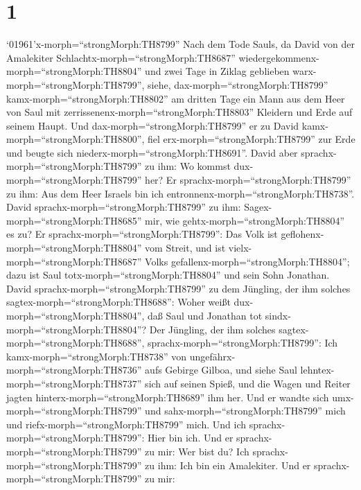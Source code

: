 \hypertarget{section}{%
\section{1}\label{section}}

 `01961'\textbar x-morph=``strongMorph:TH8799'' Nach dem
Tode Sauls, da David von der Amalekiter
Schlachtx-morph=``strongMorph:TH8687''
wiedergekommenx-morph=``strongMorph:TH8804'' und zwei Tage in Ziklag
geblieben warx-morph=``strongMorph:TH8799'',  siehe,
dax-morph=``strongMorph:TH8799'' kamx-morph=``strongMorph:TH8802'' am
dritten Tage ein Mann aus dem Heer von Saul mit
zerrissenenx-morph=``strongMorph:TH8803'' Kleidern und Erde auf seinem
Haupt. Und dax-morph=``strongMorph:TH8799'' er zu David
kamx-morph=``strongMorph:TH8800'', fiel erx-morph=``strongMorph:TH8799''
zur Erde und beugte sich niederx-morph=``strongMorph:TH8691''.
 David aber sprachx-morph=``strongMorph:TH8799'' zu ihm: Wo
kommst dux-morph=``strongMorph:TH8799'' her? Er
sprachx-morph=``strongMorph:TH8799'' zu ihm: Aus dem Heer Israels bin
ich entronnenx-morph=``strongMorph:TH8738''.  David
sprachx-morph=``strongMorph:TH8799'' zu ihm:
Sagex-morph=``strongMorph:TH8685'' mir, wie
gehtx-morph=``strongMorph:TH8804'' es zu? Er
sprachx-morph=``strongMorph:TH8799'': Das Volk ist
geflohenx-morph=``strongMorph:TH8804'' vom Streit, und ist
vielx-morph=``strongMorph:TH8687'' Volks
gefallenx-morph=``strongMorph:TH8804''; dazu ist Saul
totx-morph=``strongMorph:TH8804'' und sein Sohn Jonathan. 
David sprachx-morph=``strongMorph:TH8799'' zu dem Jüngling, der ihm
solches sagtex-morph=``strongMorph:TH8688'': Woher weißt
dux-morph=``strongMorph:TH8804'', daß Saul und Jonathan tot
sindx-morph=``strongMorph:TH8804''?  Der Jüngling, der ihm
solches sagtex-morph=``strongMorph:TH8688'',
sprachx-morph=``strongMorph:TH8799'': Ich
kamx-morph=``strongMorph:TH8738'' von
ungefährx-morph=``strongMorph:TH8736'' aufs Gebirge Gilboa, und siehe
Saul lehntex-morph=``strongMorph:TH8737'' sich auf seinen Spieß, und die
Wagen und Reiter jagten hinterx-morph=``strongMorph:TH8689'' ihm her.
 Und er wandte sich umx-morph=``strongMorph:TH8799'' und
sahx-morph=``strongMorph:TH8799'' mich und
riefx-morph=``strongMorph:TH8799'' mich. Und ich
sprachx-morph=``strongMorph:TH8799'': Hier bin ich.  Und er
sprachx-morph=``strongMorph:TH8799'' zu mir: Wer bist du? Ich
sprachx-morph=``strongMorph:TH8799'' zu ihm: Ich bin ein Amalekiter.
 Und er sprachx-morph=``strongMorph:TH8799'' zu mir:
